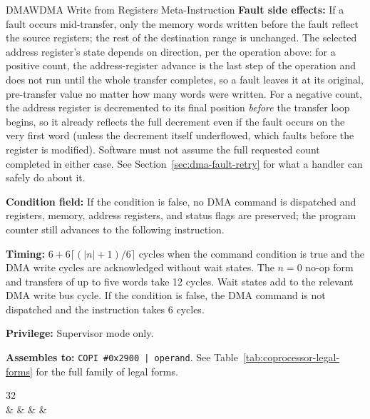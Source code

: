 \begin{instructionbox}{DMAW}{DMA Write from Registers Meta-Instruction}
	\textbf{Fault side effects:} If a fault occurs mid-transfer, only the memory words written before the fault
	reflect the source registers; the rest of the destination range is unchanged. The selected address register's
	state depends on direction, per the operation above: for a positive count, the address-register advance is the
	last step of the operation and does not run until the whole transfer completes, so a fault leaves it at its
	original, pre-transfer value no matter how many words were written. For a negative count, the address register
	is decremented to its final position \textit{before} the transfer loop begins, so it already reflects the full
	decrement even if the fault occurs on the very first word (unless the decrement itself underflowed, which faults
	before the register is modified). Software must not assume the full requested count
	completed in either case. See Section~\ref{sec:dma-fault-retry} for what a handler can safely do about it.

	\textbf{Condition field:} If the condition is false, no DMA command is dispatched and registers, memory, address
	registers, and status flags are preserved; the program counter still advances to the following instruction.

	\textbf{Timing:} $6 + 6\lceil (|n| + 1)/6 \rceil$ cycles when the command condition is true and the DMA write cycles are
	acknowledged without wait states. The $n = 0$ no-op form and transfers of up to five words take 12 cycles. Wait states add
	to the relevant DMA write bus cycle. If the condition is false, the DMA command is not dispatched and the instruction
	takes 6 cycles.

	\textbf{Privilege:} Supervisor mode only.

	\textbf{Assembles to:} \texttt{COPI \#0x2900 | operand}. See Table~\ref{tab:coprocessor-legal-forms} for the full family of legal forms.

	\begin{center}
		\begin{bytefield}[bitwidth=1.1em]{32}
			 \\
			 &
			 &
			 &
			 &
		\end{bytefield}
	\end{center}


\end{instructionbox}
